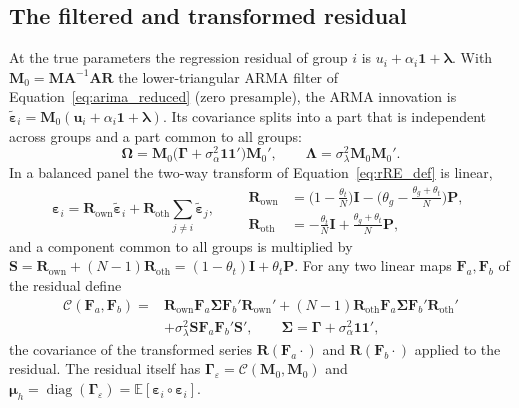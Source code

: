 \documentclass[12pt]{article}
\begin{document}
\subsection{The filtered and transformed residual}
At the true parameters the regression residual of group $i$ is $u_i+\alpha_i\mathbf 1+\boldsymbol\lambda$. With $\mathbf M_0=\mathbf{MA}^{-1}\mathbf{AR}$ the lower-triangular ARMA filter of Equation~\ref{eq:arima_reduced} (zero presample), the ARMA innovation is $\tilde{\boldsymbol\varepsilon}_i=\mathbf M_0(\mathbf u_i+\alpha_i\mathbf 1+\boldsymbol\lambda)$. Its covariance splits into a part that is independent across groups and a part common to all groups:
\begin{equation}
\boldsymbol\Omega=\mathbf M_0\big(\boldsymbol\Gamma+\sigma_\alpha^2\mathbf 1\mathbf 1'\big)\mathbf M_0',\qquad
\boldsymbol\Lambda=\sigma_\lambda^2\mathbf M_0\mathbf M_0'.
\label{eq:df-omega-lambda}
\end{equation}
In a balanced panel the two-way transform of Equation~\ref{eq:rRE_def} is linear,
\begin{equation}
\boldsymbol\varepsilon_i=\mathbf R_{\mathrm{own}}\tilde{\boldsymbol\varepsilon}_i+\mathbf R_{\mathrm{oth}}\sum_{j\neq i}\tilde{\boldsymbol\varepsilon}_j,\qquad
\begin{aligned}
\mathbf R_{\mathrm{own}}&=\big(1-\tfrac{\theta_t}{N}\big)\mathbf I-\big(\theta_g-\tfrac{\theta_g+\theta_t}{N}\big)\mathbf P,\\
\mathbf R_{\mathrm{oth}}&=-\tfrac{\theta_t}{N}\mathbf I+\tfrac{\theta_g+\theta_t}{N}\mathbf P,
\end{aligned}
\label{eq:df-transform}
\end{equation}
and a component common to all groups is multiplied by $\mathbf S=\mathbf R_{\mathrm{own}}+(N-1)\mathbf R_{\mathrm{oth}}=(1-\theta_t)\mathbf I+\theta_t\mathbf P$. For any two linear maps $\mathbf F_a,\mathbf F_b$ of the residual define
\begin{equation}
\begin{aligned}
\mathcal C(\mathbf F_a,\mathbf F_b)={}&\mathbf R_{\mathrm{own}}\mathbf F_a\boldsymbol\Sigma\mathbf F_b'\mathbf R_{\mathrm{own}}'+(N-1)\mathbf R_{\mathrm{oth}}\mathbf F_a\boldsymbol\Sigma\mathbf F_b'\mathbf R_{\mathrm{oth}}'\\
&+\sigma_\lambda^2\mathbf S\mathbf F_a\mathbf F_b'\mathbf S',
\qquad \boldsymbol\Sigma=\boldsymbol\Gamma+\sigma_\alpha^2\mathbf 1\mathbf 1',
\end{aligned}
\label{eq:df-cov}
\end{equation}
the covariance of the transformed series $\mathbf R(\mathbf F_a\cdot)$ and $\mathbf R(\mathbf F_b\cdot)$ applied to the residual. The residual itself has $\boldsymbol\Gamma_\varepsilon=\mathcal C(\mathbf M_0,\mathbf M_0)$ and $\boldsymbol\mu_h=\operatorname{diag}(\boldsymbol\Gamma_\varepsilon)=\mathbb E[\boldsymbol\varepsilon_i\circ\boldsymbol\varepsilon_i]$.
\end{document}
